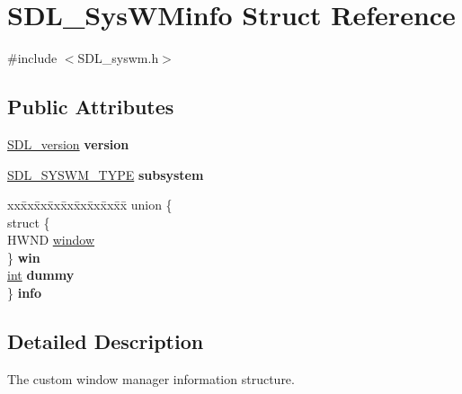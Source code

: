 \hypertarget{struct_s_d_l___sys_w_minfo}{}\section{S\+D\+L\+\_\+\+Sys\+W\+Minfo Struct Reference}
\label{struct_s_d_l___sys_w_minfo}


{\ttfamily \#include $<$S\+D\+L\+\_\+syswm.\+h$>$}

\subsection*{Public Attributes}
\begin{DoxyCompactItemize}
\item 
\hypertarget{struct_s_d_l___sys_w_minfo_ac3a70af022d4849e9ff546595e94627f}{}\hyperlink{struct_s_d_l__version}{S\+D\+L\+\_\+version} {\bfseries version}\label{struct_s_d_l___sys_w_minfo_ac3a70af022d4849e9ff546595e94627f}

\item 
\hypertarget{struct_s_d_l___sys_w_minfo_a438b6a06ab3ee417293c7b7fc5a23855}{}\hyperlink{_s_d_l__syswm_8h_a064c26598287280fff2a00d6758ac4f7}{S\+D\+L\+\_\+\+S\+Y\+S\+W\+M\+\_\+\+T\+Y\+P\+E} {\bfseries subsystem}\label{struct_s_d_l___sys_w_minfo_a438b6a06ab3ee417293c7b7fc5a23855}

\item 
\hypertarget{struct_s_d_l___sys_w_minfo_ac5ffb763b235a13ef356f399bb85276a}{}\begin{tabbing}
xx\=xx\=xx\=xx\=xx\=xx\=xx\=xx\=xx\=\kill
union \{\\
\>struct \{\\
\>\>HWND \hyperlink{struct_s_d_l___sys_w_minfo_af06225591ff07e837bbd037728a525b9}{window}\\
\>\} {\bfseries win}\\
\>\hyperlink{_s_d_l__thread_8h_a6a64f9be4433e4de6e2f2f548cf3c08e}{int} {\bfseries dummy}\\
\} {\bfseries info}\label{struct_s_d_l___sys_w_minfo_ac5ffb763b235a13ef356f399bb85276a}
\\

\end{tabbing}\end{DoxyCompactItemize}


\subsection{Detailed Description}
The custom window manager information structure.

